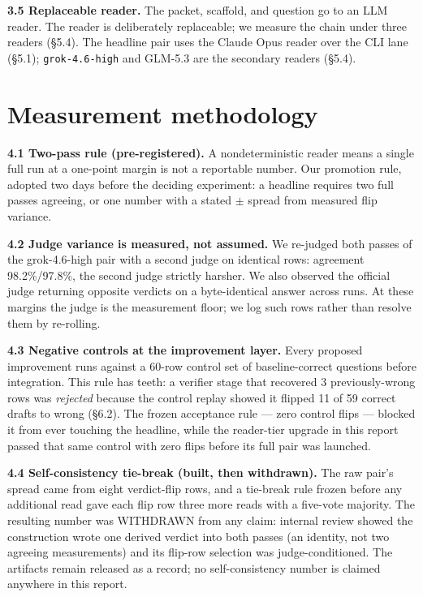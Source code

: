 \documentclass[11pt]{article}
\begin{document}
\textbf{3.5 Replaceable reader.} The packet, scaffold, and question go to an
LLM reader. The reader is deliberately replaceable; we measure the chain
under three readers (\S5.4). The headline pair uses the Claude Opus reader
over the CLI lane (\S5.1); \texttt{grok-4.6-high} and GLM-5.3 are the
secondary readers (\S5.4).

\section{Measurement methodology}
\textbf{4.1 Two-pass rule (pre-registered).} A nondeterministic reader means a
single full run at a one-point margin is not a reportable number. Our
promotion rule, adopted two days before the deciding experiment: a headline
requires two full
passes agreeing, or one number with a stated $\pm$ spread from measured flip
variance.

\textbf{4.2 Judge variance is measured, not assumed.} We re-judged both passes
of the grok-4.6-high pair with a second judge on identical rows: agreement
98.2\%/97.8\%, the second judge strictly harsher. We also observed the official
judge returning opposite verdicts on a byte-identical answer across runs. At
these margins the judge is the measurement floor; we log such rows rather than
resolve them by re-rolling.

\textbf{4.3 Negative controls at the improvement layer.} Every proposed
improvement runs against a 60-row control set of baseline-correct questions
before integration. This rule has teeth: a verifier stage that recovered 3
previously-wrong rows was \emph{rejected} because the control replay showed it
flipped 11 of 59 correct drafts to wrong (\S6.2). The frozen acceptance rule
--- zero control flips --- blocked it from ever touching the headline, while
the reader-tier upgrade in this report passed that same control with zero
flips before its full pair was launched.

\textbf{4.4 Self-consistency tie-break (built, then withdrawn).} The raw
pair's spread came from eight verdict-flip rows, and a tie-break rule frozen
before any additional read gave each flip row three more reads with a
five-vote majority. The resulting number was WITHDRAWN from any claim:
internal review showed the construction wrote one derived verdict into both
passes (an identity, not two agreeing measurements) and its flip-row
selection was judge-conditioned. The artifacts remain released as a record;
no self-consistency number is claimed anywhere in this report.
\end{document}
